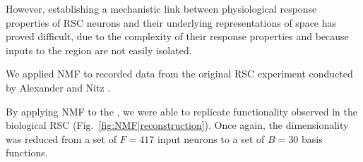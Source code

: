 However, establishing a mechanistic link between physiological response properties of \ac{RSC} neurons and their underlying representations of space has proved difficult, due to the complexity of their response properties and because inputs to the region are not easily isolated.


We applied NMF to recorded data from the original \ac{RSC} experiment conducted by
Alexander and Nitz \cite{AlexanderNitz2015}. 


By applying \ac{NMF} to the , we were able to replicate
functionality observed in the biological \ac{RSC} (Fig.~\ref{fig:NMF|reconstruction}).
Once again, the dimensionality was reduced from a set of $F = 417$ input neurons to a set of $B = 30$ basis functions.



